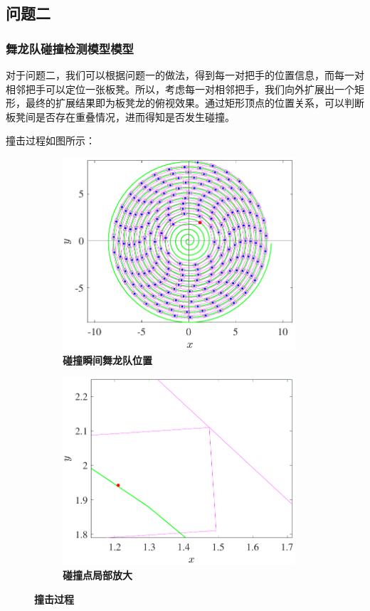 \documentclass[zihao=-4, UTF8]{article}		%
\theoremstyle{MyLineTheoremStyle} %
\theoremstyle{MyBlockTheoremStyle} %
\theoremstyle{MySubsubsectionStyle} %
\begin{document}
\subsection{问题二}
\subsubsection{舞龙队碰撞检测模型模型}
对于问题二，我们可以根据问题一的做法，得到每一对把手的位置信息，而每一对相邻把手可以定位一张板凳。所以，考虑每一对相邻把手，我们向外扩展出一个矩形，最终的扩展结果即为板凳龙的俯视效果。通过矩形顶点的位置关系，可以判断板凳间是否存在重叠情况，进而得知是否发生碰撞。

撞击过程如图所示：

\begin{figure}[H]\centering
\begin{subfigure}[t]{0.47\textwidth}\centering
    \includegraphics[width=0.95\textwidth]{assets/Q2碰撞示意图.pdf}
    \caption{\bfseries 碰撞瞬间舞龙队位置 }
\end{subfigure}\begin{subfigure}[t]{0.47\textwidth}\centering
    \includegraphics[width=0.95\textwidth]{assets/Q2碰撞示意图（放大）.pdf}
    \caption{\bfseries 碰撞点局部放大 }
\end{subfigure}
\caption{\bfseries 撞击过程 }
\end{figure}
\end{document}

